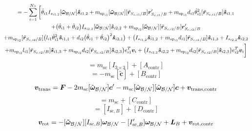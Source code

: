 \documentclass[paper]{aiaaNew}
\begin{document}
\begin{multline}
\end{multline}\begin{multline}
[v_{\text{rot,contr}}] = -\sum\limits_{i=1}^{N_S} \bigg[
\dot{\theta}_{i1} I_{s_{i1,2}} [\bm{\tilde{\omega}}_{\cal B/N}] \bm{\hat{s}}_{i1,2} 
+m_{\text{sp}_{i1}} [\bm{\tilde{\omega}}_{\cal B/N}] [\tilde{\bm{r}}_{S_{c,i1}/B}] \bm{r}'_{S_{c,i1}/B} +m_{\text{sp}_{i1}}d_{i1}\dot{\theta}_{i1}^2  [\tilde{\bm{r}}_{S_{c,i1}/B}] \bm{\hat{s}}_{i1,1}
\\
+ \big(\dot{\theta}_{i1}+\dot{\theta}_{i2}\big) I_{s_{i2,2}}[\bm{\tilde{\omega}}_{\cal B/N}]\bm{\hat{s}}_{i2,2}
+m_{\text{sp}_{i2}} [\bm{\tilde{\omega}}_{\cal B/N}] [\tilde{\bm{r}}_{S_{c,i2}/B}] \bm{r}'_{S_{c,i2}/B} 	\\+m_{\text{sp}_{i2}} [\tilde{\bm{r}}_{S_{c,i2}/B}] \big(l_{i1} \dot{\theta}_{i1}^2 \bm{\hat{s}}_{i1,1} + d_{i2}\big(\dot{\theta}_{i1} + \dot{\theta}_{i2}\big)^2\bm{\hat{s}}_{i2,1}\big) +   \big(I_{s_{i1,2}}\bm{\hat{s}}_{i1,2}+m_{\text{sp}_{i1}}d_{i1} [\tilde{\bm{r}}_{S_{c,i1}/B}]   \bm{\hat{s}}_{i1,3} + I_{s_{i2,2}}\bm{\hat{s}}_{i2,2}\\
+m_{\text{sp}_{i2}}l_{i1} [\tilde{\bm{r}}_{S_{c,i2}/B}]  \bm{\hat{s}}_{i1,3}+m_{\text{sp}_{i2}}d_{i2} [\tilde{\bm{r}}_{S_{c,i2}/B}] \bm{\hat{s}}_{i2,3}\big)e_{i1}^T\bm v_i+\big( I_{s_{i2,2}}\bm{\hat{s}}_{i2,2}+m_{\text{sp}_{i2}} d_{i2} [\tilde{\bm{r}}_{S_{c,i2}/B}] \bm{\hat{s}}_{i2,3}\big)e_{i2}^T\bm v_i\bigg]
\end{multline}\begin{equation}
[A]  = m_\text{sc} [I_{3\times 3}] + [A_{\text{contr}}]
\end{equation}\begin{equation}
[B] = -m_\text{sc} [\tilde{\bm{c}}] + [B_{\text{contr}}]
\end{equation}\begin{equation}
\bm v_{\text{trans}} = \bm F - 2m_\text{sc} [\tilde{\bm\omega}_{\cal B/N}] \bm c'- m_\text{sc} [\tilde{\bm\omega}_{\cal B/N}][\tilde{\bm\omega}_{\cal B/N}]\bm{c} + \bm v_{\text{trans,contr}}
\end{equation}\begin{equation}
[C] = m_{\text{sc}} + [C_{\text{contr}}]
\end{equation}\begin{equation}
[D] =  [I_{\text{sc},B}] + [D_{\text{contr}}]
\end{equation}\begin{equation}
\bm v_{\text{rot}} = -[\bm{\tilde{\omega}}_{\cal B/N}] [I_{\text{sc},B}] \bm\omega_{\cal B/N} - [I'_{\text{sc},B}] \bm\omega_{\cal B/N} + \bm{L}_B + \bm v_{\text{rot,contr}}
\end{equation}
\end{document}
